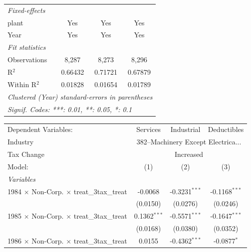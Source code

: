 \documentclass[
  12pt]{article}
\theoremstyle{definition}
\theoremstyle{remark}
\begin{document}
\begin{table}
\begin{minipage}{\linewidth}
\begin{tabular}{lccc}
   \midrule
   \emph{Fixed-effects}\\
   plant                                                   & Yes             & Yes        & Yes\\  
   Year                                                    & Yes             & Yes        & Yes\\  
   \midrule
   \emph{Fit statistics}\\
   Observations                                            & 8,287           & 8,273      & 8,296\\  
   R$^2$                                                   & 0.66432         & 0.71721    & 0.67879\\  
   Within R$^2$                                            & 0.01828         & 0.01654    & 0.01789\\  
   \midrule \midrule
   \multicolumn{4}{l}{\emph{Clustered (Year) standard-errors in parentheses}}\\
   \multicolumn{4}{l}{\emph{Signif. Codes: ***: 0.01, **: 0.05, *: 0.1}}\\
\end{tabular}
\par\endgroup
\begingroup
\centering
\begin{tabular}{lccc}
   \tabularnewline \midrule \midrule
   Dependent Variables:                                    & Services       & Industrial      & Deductibles\\  
   Industry & \multicolumn{3}{c}{382–Machinery Except Electrica...} \\ 
   Tax Change & \multicolumn{3}{c}{Increased} \\ 
   Model:                                                  & (1)            & (2)             & (3)\\  
   \midrule
   \emph{Variables}\\
   1984 $\times$ Non-Corp. $\times$ treat\_3tax\_treat     & -0.0068        & -0.3231$^{***}$ & -0.1168$^{***}$\\   
                                                           & (0.0150)       & (0.0276)        & (0.0246)\\   
   1985 $\times$ Non-Corp. $\times$ treat\_3tax\_treat     & 0.1362$^{***}$ & -0.5571$^{***}$ & -0.1647$^{***}$\\   
                                                           & (0.0168)       & (0.0380)        & (0.0352)\\   
   1986 $\times$ Non-Corp. $\times$ treat\_3tax\_treat     & 0.0155         & -0.4362$^{***}$ & -0.0877$^{*}$\\   

\end{tabular}
\end{minipage}
\end{table}
\end{document}
